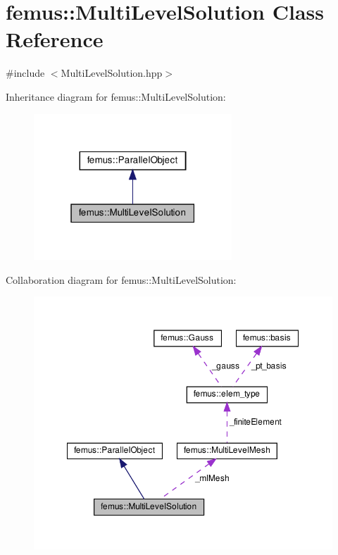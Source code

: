 \hypertarget{classfemus_1_1_multi_level_solution}{}\section{femus\+:\+:Multi\+Level\+Solution Class Reference}
\label{classfemus_1_1_multi_level_solution}


{\ttfamily \#include $<$Multi\+Level\+Solution.\+hpp$>$}



Inheritance diagram for femus\+:\+:Multi\+Level\+Solution\+:
\nopagebreak
\begin{figure}[H]
\begin{center}
\leavevmode
\includegraphics[width=211pt]{classfemus_1_1_multi_level_solution__inherit__graph}
\end{center}
\end{figure}


Collaboration diagram for femus\+:\+:Multi\+Level\+Solution\+:
\nopagebreak
\begin{figure}[H]
\begin{center}
\leavevmode
\includegraphics[width=350pt]{classfemus_1_1_multi_level_solution__coll__graph}
\end{center}
\end{figure}
